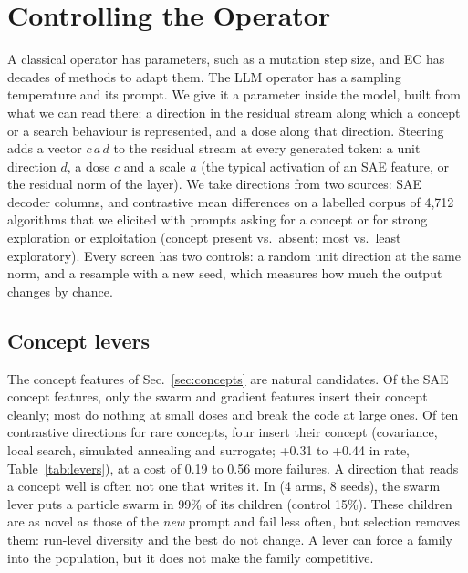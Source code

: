 \section{Controlling the Operator}\label{sec:steering}

A classical operator has parameters, such as a mutation step size, and
EC has decades of methods to adapt them. The LLM operator has a
sampling temperature and its prompt. We give it a parameter inside the
model, built from what we can read there: a direction in the residual
stream along which a concept or a search behaviour is represented, and
a dose along that direction. Steering adds a vector $c\,a\,d$ to the residual stream at every
generated token: a unit direction $d$, a dose $c$ and a scale $a$ (the
typical activation of an SAE feature, or the residual norm of the
layer). We take directions from two sources: SAE decoder columns, and
contrastive mean differences on a labelled corpus of 4,712 algorithms
that we elicited with prompts asking for a concept or for strong
exploration or exploitation (concept present vs.\ absent; most vs.\ least
exploratory). Every screen has two controls: a random unit direction at
the same norm, and a resample with a new seed, which measures how much
the output changes by chance.

\subsection{Concept levers}
The concept features of Sec.~\ref{sec:concepts} are natural candidates.
Of the SAE concept features, only the swarm and gradient features
insert their concept cleanly; most do nothing at small doses and break
the code at large ones. Of ten contrastive directions for rare concepts,
four insert their concept (covariance, local search, simulated annealing
and surrogate; +0.31 to +0.44 in rate, Table~\ref{tab:levers}), at a
cost of 0.19 to 0.56 more failures. A direction that reads a concept
well is often not one that writes it. In \llamea (4 arms, 8 seeds), the
swarm lever puts a particle swarm in 99\% of its children (control
15\%). These children are as novel as those of the \emph{new} prompt
and fail less often, but selection removes them: run-level diversity and
the best \aocc do not change. A lever can force a family into the
population, but it does not make the family competitive.

